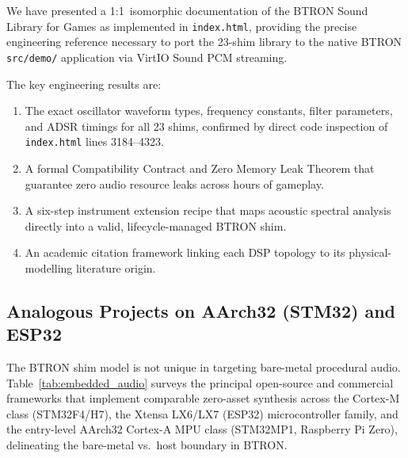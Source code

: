 \documentclass[10pt,journal,compsoc,twocolumn]{article}
\begin{document}
We have presented a 1:1~isomorphic documentation of the BTRON Sound Library
for Games as implemented in \texttt{index.html}, providing the precise
engineering reference necessary to port the 23-shim library to the native
BTRON \texttt{src/demo/} application via VirtIO Sound PCM streaming.

The key engineering results are:
\begin{enumerate}[leftmargin=*]
    \item The exact oscillator waveform types, frequency constants, filter
    parameters, and ADSR timings for all 23 shims, confirmed by direct code
    inspection of \texttt{index.html} lines 3184--4323.
    \item A formal Compatibility Contract and Zero Memory Leak Theorem that
    guarantee zero audio resource leaks across hours of gameplay.
    \item A six-step instrument extension recipe that maps acoustic spectral
    analysis directly into a valid, lifecycle-managed BTRON shim.
    \item An academic citation framework linking each DSP topology to its
    physical-modelling literature origin.
\end{enumerate}

\subsection*{Analogous Projects on AArch32 (STM32) and ESP32}

The BTRON shim model is not unique in targeting bare-metal procedural
audio.  Table~\ref{tab:embedded_audio} surveys the principal open-source
and commercial frameworks that implement comparable zero-asset synthesis
across the Cortex-M class (STM32F4/H7), the Xtensa LX6/LX7 (ESP32)
microcontroller family, and the entry-level AArch32 Cortex-A MPU class
(STM32MP1, Raspberry Pi Zero), delineating the bare-metal vs.\ host
boundary in BTRON.
\end{document}
